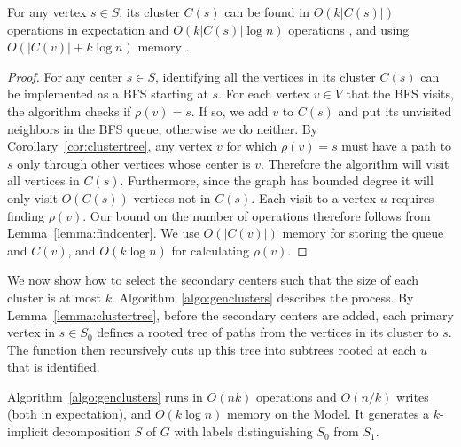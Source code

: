 \begin{lemma}
\label{lemma:findcluster}
For any vertex $s \in S$, its cluster $C(s)$
can be found in $O(k \lvert C(s)\rvert)$ operations in expectation and $O(k
\lvert C(s)\rvert \log n)$ operations \whp{}, and using $O(\lvert C(v)\rvert + k\log n)$ \local{} memory \whp{}.
\end{lemma}
\begin{proof}
For any center $s \in S$, identifying all the vertices in its cluster
$C(s)$ can be implemented as a BFS starting at $s$.  For each vertex
$v \in V$ that the BFS visits, the algorithm checks if $\rho(v) = s$.
If so, we add $v$ to $C(s)$ and put its unvisited neighbors in the BFS
queue, otherwise we do neither.
By Corollary~\ref{cor:clustertree}, any
vertex $v$ for which $\rho(v) = s$ must have a path to $s$ only through
other vertices whose center is $v$.   Therefore the algorithm will
visit all vertices in $C(s)$.  Furthermore, since the graph has
bounded degree it will only visit $O(C(s))$ vertices not in $C(s)$.
Each visit to a vertex $u$ requires finding $\rho(v)$.  Our bound on the
number of operations therefore follows from Lemma~\ref{lemma:findcenter}.
We use $O(|C(v)|)$ \local{} memory for storing the queue and $C(v)$,
and $O(k\log n)$ \whp{} for calculating $\rho(v)$.
\end{proof}



We now show how to select the secondary centers such that
the size of each cluster is at most $k$.
Algorithm~\ref{algo:genclusters} describes the process.  By
Lemma~\ref{lemma:clustertree}, before the secondary centers are
added, each primary vertex in $s \in S_0$ defines a rooted tree of
paths from the vertices in its cluster to $s$.  The function
 then recursively cuts up this tree into subtrees
rooted at each $u$ that is identified.

\begin{lemma}\label{lemma:genclusters}
Algorithm~\ref{algo:genclusters} runs in
$O(n k)$ operations and $O(n/k)$ writes (both in expectation), and
$O(k \log n)$ \local{} memory \whp{} on the \seqmodel{} Model.
It generates a $k$-implicit
decomposition $S$ of $G$ with labels distinguishing $S_0$ from $S_1$.
\end{lemma}

